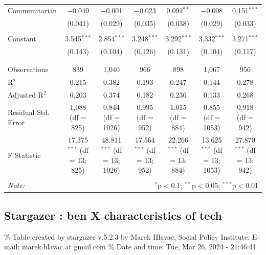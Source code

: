 \documentclass[
]{article}
\begin{document}
\begin{landscape}
\begin{table}[!htbp]
\begin{tabular}{@{\extracolsep{5pt}}lcccccc}
 Communitarian & $-$0.049 & $-$0.001 & $-$0.023 & 0.091$^{**}$ & $-$0.008 & 0.151$^{***}$ \\ 
  & (0.041) & (0.029) & (0.035) & (0.038) & (0.029) & (0.033) \\ 
  & & & & & & \\ 
 Constant & 3.545$^{***}$ & 2.854$^{***}$ & 3.248$^{***}$ & 3.292$^{***}$ & 3.332$^{***}$ & 3.271$^{***}$ \\ 
  & (0.143) & (0.104) & (0.126) & (0.131) & (0.104) & (0.117) \\ 
  & & & & & & \\ 
\hline \\[-1.8ex] 
Observations & 839 & 1,040 & 966 & 898 & 1,067 & 956 \\ 
R$^{2}$ & 0.215 & 0.382 & 0.193 & 0.247 & 0.144 & 0.278 \\ 
Adjusted R$^{2}$ & 0.203 & 0.374 & 0.182 & 0.236 & 0.133 & 0.268 \\ 
Residual Std. Error & 1.088 (df = 825) & 0.844 (df = 1026) & 0.995 (df = 952) & 1.015 (df = 884) & 0.855 (df = 1053) & 0.918 (df = 942) \\ 
F Statistic & 17.375$^{***}$ (df = 13; 825) & 48.811$^{***}$ (df = 13; 1026) & 17.564$^{***}$ (df = 13; 952) & 22.266$^{***}$ (df = 13; 884) & 13.625$^{***}$ (df = 13; 1053) & 27.870$^{***}$ (df = 13; 942) \\ 
\hline 
\hline \\[-1.8ex] 
\textit{Note:}  & \multicolumn{6}{r}{$^{*}$p$<$0.1; $^{**}$p$<$0.05; $^{***}$p$<$0.01} \\ 
\end{tabular} 
\end{table} 
\endgroup

\end{landscape}

\newpage

\hypertarget{stargazer-ben-x-characteristics-of-tech}{%
\subsection{Stargazer : ben X characteristics of
tech}\label{stargazer-ben-x-characteristics-of-tech}}

\begingroup\setlength{\tabcolsep}{1pt}

\renewcommand{\arraystretch}{0.7}

\% Table created by stargazer v.5.2.3 by Marek Hlavac, Social Policy
Institute. E-mail: marek.hlavac at gmail.com \% Date and time: Tue, Mar
26, 2024 - 21:46:41
\end{document}
